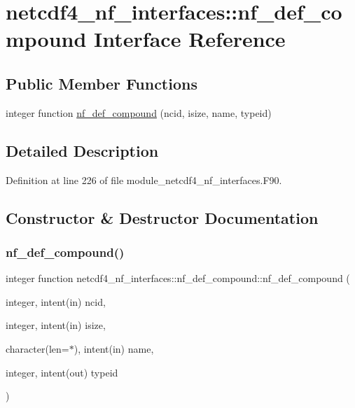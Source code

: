 \hypertarget{interfacenetcdf4__nf__interfaces_1_1nf__def__compound}{}\section{netcdf4\+\_\+nf\+\_\+interfaces\+:\+:nf\+\_\+def\+\_\+compound Interface Reference}
\label{interfacenetcdf4__nf__interfaces_1_1nf__def__compound}
\subsection*{Public Member Functions}
\begin{DoxyCompactItemize}
\item 
integer function \hyperlink{interfacenetcdf4__nf__interfaces_1_1nf__def__compound_ad6c76b5a7a88df45a29d0d63c8ea1d05}{nf\+\_\+def\+\_\+compound} (ncid, isize, name, typeid)
\end{DoxyCompactItemize}


\subsection{Detailed Description}


Definition at line 226 of file module\+\_\+netcdf4\+\_\+nf\+\_\+interfaces.\+F90.



\subsection{Constructor \& Destructor Documentation}
\mbox{\label{interfacenetcdf4__nf__interfaces_1_1nf__def__compound_ad6c76b5a7a88df45a29d0d63c8ea1d05}} 
\subsubsection{\texorpdfstring{nf\+\_\+def\+\_\+compound()}{nf\_def\_compound()}}
{\footnotesize\ttfamily integer function netcdf4\+\_\+nf\+\_\+interfaces\+::nf\+\_\+def\+\_\+compound\+::nf\+\_\+def\+\_\+compound (\begin{DoxyParamCaption}\item[{integer, intent(in)}]{ncid,  }\item[{integer, intent(in)}]{isize,  }\item[{character(len=$\ast$), intent(in)}]{name,  }\item[{integer, intent(out)}]{typeid }\end{DoxyParamCaption})}




